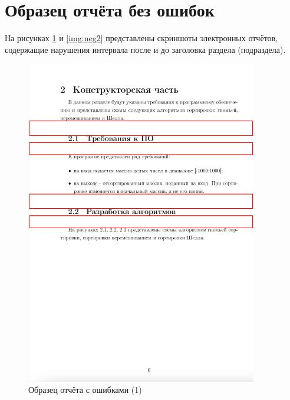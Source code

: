 \section{Образец отчёта без ошибок}
На рисунках \ref{img:neg1} и \ref{img:neg2} представлены скриншоты электронных отчётов, содержащие нарушения интервала после и до заголовка раздела (подраздела).

\begin{figure}
	\centering
	\includegraphics[width=0.9\textwidth]{images/neg1.png}
	\caption{Образец отчёта с ошибками (1)}
	\label{img:neg1}
\end{figure}

